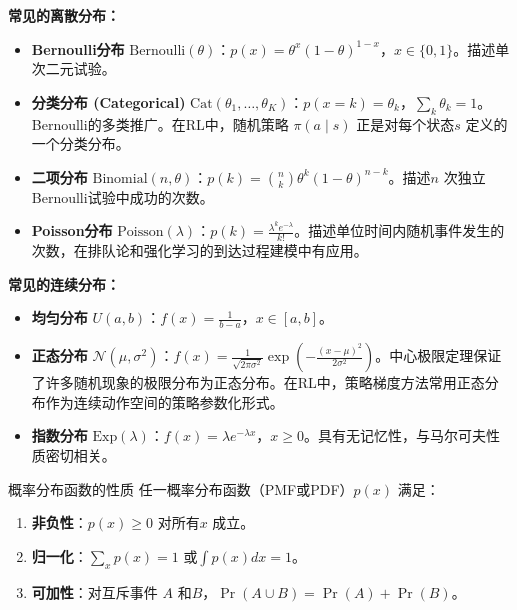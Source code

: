 \textbf{常见的离散分布：}
\begin{itemize}
    \item \textbf{Bernoulli分布} $\mathrm{Bernoulli}(\theta)$：$p(x) = \theta^x (1-\theta)^{1-x}$，$x \in \{0,1\}$。描述单次二元试验。
    \item \textbf{分类分布 (Categorical)} $\mathrm{Cat}(\theta_1, \dots, \theta_K)$：$p(x = k) = \theta_k$，$\sum_k \theta_k = 1$。Bernoulli的多类推广。在RL中，随机策略 $\pi(a \mid s)$ 正是对每个状态$s$ 定义的一个分类分布。
    \item \textbf{二项分布} $\mathrm{Binomial}(n, \theta)$：$p(k) = \binom{n}{k} \theta^k (1-\theta)^{n-k}$。描述$n$ 次独立Bernoulli试验中成功的次数。
    \item \textbf{Poisson分布} $\mathrm{Poisson}(\lambda)$：$p(k) = \frac{\lambda^k e^{-\lambda}}{k!}$。描述单位时间内随机事件发生的次数，在排队论和强化学习的到达过程建模中有应用。
\end{itemize}

\textbf{常见的连续分布：}
\begin{itemize}
    \item \textbf{均匀分布} $U(a, b)$：$f(x) = \frac{1}{b-a}$，$x \in [a, b]$。
    \item \textbf{正态分布} $\mathcal{N}(\mu, \sigma^2)$：$f(x) = \frac{1}{\sqrt{2\pi\sigma^2}} \exp\left(-\frac{(x-\mu)^2}{2\sigma^2}\right)$。中心极限定理保证了许多随机现象的极限分布为正态分布。在RL中，策略梯度方法常用正态分布作为连续动作空间的策略参数化形式。
    \item \textbf{指数分布} $\mathrm{Exp}(\lambda)$：$f(x) = \lambda e^{-\lambda x}$，$x \ge 0$。具有无记忆性，与马尔可夫性质密切相关。
\end{itemize}

\begin{myTheorem}{概率分布函数的性质}
任一概率分布函数（PMF或PDF）$p(x)$ 满足：
\begin{enumerate}
    \item \textbf{非负性}：$p(x) \ge 0$ 对所有$x$ 成立。
    \item \textbf{归一化}：$\sum_x p(x) = 1$ 或$\int p(x)dx = 1$。
    \item \textbf{可加性}：对互斥事件 $A$ 和$B$，$\Pr(A \cup B) = \Pr(A) + \Pr(B)$。
\end{enumerate}
\end{myTheorem}


